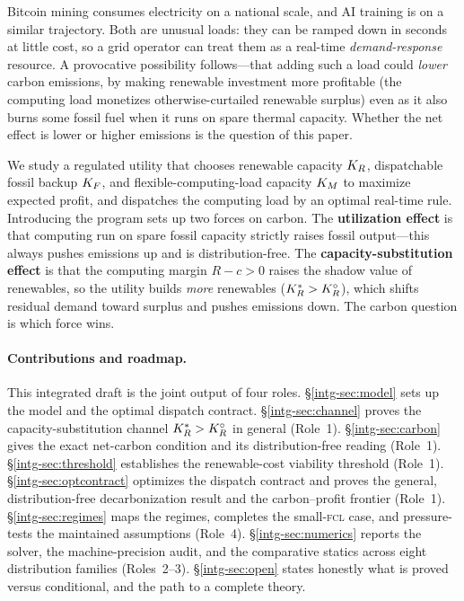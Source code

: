 Bitcoin mining consumes electricity on a national scale, and AI training is on a
similar trajectory. Both are unusual loads: they can be ramped down in seconds at
little cost, so a grid operator can treat them as a real-time \emph{demand-response}
resource. A provocative possibility follows---that adding such a load could
\emph{lower} carbon emissions, by making renewable investment more profitable (the
computing load monetizes otherwise-curtailed renewable surplus) even as it also
burns some fossil fuel when it runs on spare thermal capacity. Whether the net
effect is lower or higher emissions is the question of this paper.

We study a regulated utility that chooses renewable capacity $K_R$, dispatchable
fossil backup $K_F$, and flexible-computing-load capacity $K_M$ to maximize
expected profit, and dispatches the computing load by an optimal real-time rule.
Introducing the program sets up two forces on carbon. The \textbf{utilization
effect} is that computing run on spare fossil capacity strictly raises fossil
output---this always pushes emissions up and is distribution-free. The
\textbf{capacity-substitution effect} is that the computing margin $R-c>0$ raises
the shadow value of renewables, so the utility builds \emph{more} renewables
($K_R^{*}>K_R^{\circ}$), which shifts residual demand toward surplus and pushes emissions
down. The carbon question is which force wins.

\paragraph{Contributions and roadmap.} This integrated draft is the joint output
of four roles. \S\ref{intg-sec:model} sets up the model and the optimal dispatch
contract. \S\ref{intg-sec:channel} proves the capacity-substitution channel
$K_R^{*}>K_R^{\circ}$ in general (Role~1). \S\ref{intg-sec:carbon} gives the exact net-carbon
condition and its distribution-free reading (Role~1). \S\ref{intg-sec:threshold}
establishes the renewable-cost viability threshold (Role~1).
\S\ref{intg-sec:optcontract} optimizes the dispatch contract and proves the general,
distribution-free decarbonization result and the carbon--profit frontier (Role~1).
\S\ref{intg-sec:regimes} maps the regimes, completes the small-\textsc{fcl} case, and
pressure-tests the maintained assumptions (Role~4). \S\ref{intg-sec:numerics} reports
the solver, the machine-precision audit, and the comparative statics across eight
distribution families (Roles~2--3). \S\ref{intg-sec:open} states honestly what is
proved versus conditional, and the path to a complete theory.

